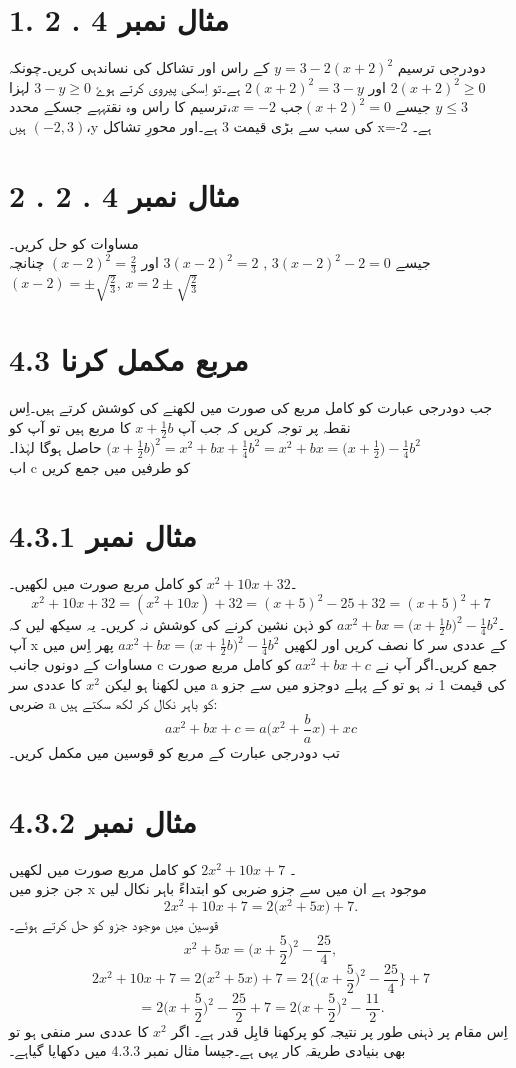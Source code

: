 \section*{مثال نمبر               4 . 2 .1}
 دودرجی ترسیم  \(y=3-2(x+2)^{2}\)  کے راس اور تشاکل کی نساندہی کریں۔چونکہ  \(2(x+2)^{2}\ge 0\) اور  \(2(x+2)^{2}=3-y\) ہے۔تو اِسکی پیروی کرتے ہوۓ  \(3-y\ge 0\) لہزا \(y\le 3\) جیسے \((x+2)^{2}=0\)جب \(x=-2\)،ترسیم کا راس وہ نقتہہے جسکے محدد \((-2,3)\) ہیں،y کی سب سے بڑی قیمت 3 ہے۔اور محورِ تشاکل x=-2 ہے۔\\
\section*{ مثال نمبر 4 . 2 . 2}
 مساوات کو حل کریں۔\\
 جیسے  \(3(x-2)^{2}-2=0\) , \(3(x-2)^{2}=2\) اور  \((x-2)^{2}=\frac{2}{3}\) چنانچہ \((x-2)=\pm \sqrt{\frac{2}{3}}\), \(x=2\pm \sqrt{\frac{2}{3}}\) \\ 
 \section*{ 4.3 مربع مکمل کرنا} 
  جب دودرجی عبارت کو کامل مربع کی صورت میں لکھنے کی کوشش کرتے ہیں۔اِس نقطہ پر توجہ کریں کہ جب آپ  \(x+\frac{1}{2}b\) کا مربع ہیں تو آپ کو  \(\big(x+\frac{1}{2}b\big)^{2}=x^{2}+bx+\frac{1}{4}b^{2}=x^{2}+bx=\big(x+\frac{1}{2}\big)-\frac{1}{4}b^{2}\) حاصل ہوگا لہٰذا۔  \\اب c کو طرفیں میں جمع کریں                     
\section*{ مثال نمبر  4.3.1}
        ۔\(x^{2}+10x+32\) کو کامل مربع صورت میں لکھیں۔ 
        \[x^{2}+10x+32=(x^{2}+10x)+32={(x+5)^{2}-25}+32=(x+5)^{2}+7\] 
        ۔\(ax^{2}+bx=\big(x+\frac{1}{2}b\big)^{2}-\frac{1}{4}b^{2}\)  کو ذہن نشین کرنے کی کوشش نہ کریں۔ یہ سیکھ لیں کہ آپ x کے عددی سر کا نصف کریں اور لکھیں  \(ax^{2}+bx=\big(x+\frac{1}{2}b\big)^{2}-\frac{1}{4}b^{2}\)  پھر اِس میں مساوات کے دونوں جانب c جمع کریں۔اگر آپ نے  \(ax^{2}+bx+c\) کو کامل مربع صورت میں لکھنا ہو لیکن \(x^{2}\) کا عددی سر a کی قیمت 1 نہ ہو تو کے پہلے دوجزو میں سے جزو ضربی a کو باہر نکال کر لکھ سکتے ہیں:
\[ax^{2}+bx+c=a\big(x^{2}+\frac{b}{a}x\big)+xc\] 
 تب دودرجی عبارت کے مربع کو قوسین میں مکمل کریں۔\\
 \newpage 
\section*{مثال نمبر 4.3.2}
۔ \(2x^{2}+10x+7\) کو کامل مربع صورت میں لکھیں \\ جن جزو میں x موجود ہے ان میں سے جزو ضربی کو ابتداءً باہر نکال لیں\\
\[2x^{2}+10x+7=2\big(x^{2}+5x)+7.\]
 قوسین میں موجود جزو کو حل کرتے ہوئے۔\\
\[x^{2}+5x=\big(x+\frac{5}{2}\big)^{2}-\frac{25}{4},\]
\[2x^{2}+10x+7=2\big(x^{2}+5x\big)+7=2\big\{\big(x+\frac{5}{2}\big)^{2}-\frac{25}{4}\big\}+7\]
\[=2\big(x+\frac{5}{2}\big)^{2}-\frac{25}{2}+7=2\big(x+\frac{5}{2}\big)^{2}-\frac{11}{2}.\]
  اِس مقام پر ذہنی طور پر نتیجہ کو پرکھنا قابِل قدر ہے۔
 اگر  \(x^{2}\) کا عددی سر منفی ہو تو بھی بنیادی طریقہ کار یہی ہے۔جیسا مثال نمبر 4.3.3 میں دکھایا گیاہے۔

